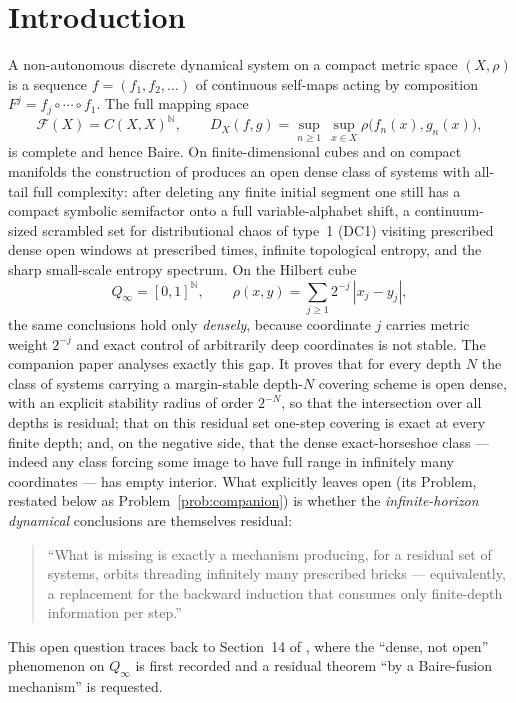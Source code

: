 \documentclass[11pt]{article}
\newcommand{\Q}{Q_\infty}
\newcommand{\F}{\mathcal{F}}
\begin{document}
\section{Introduction}\label{sec:intro}

A non-autonomous discrete dynamical system on a compact metric space $(X,\rho)$ is a
sequence $f=(f_1,f_2,\dots)$ of continuous self-maps acting by composition
$F^j=f_{j}\circ\cdots\circ f_1$.  The full mapping space
\[
\F(X)=C(X,X)^{\mathbb N},
\qquad
D_X(f,g)=\sup_{n\ge1}\,\sup_{x\in X}\rho\bigl(f_n(x),g_n(x)\bigr),
\]
is complete and hence Baire.  On finite-dimensional cubes and on compact manifolds the
construction of \cite{Shmalo2026} produces an open dense class of systems with all-tail
full complexity: after deleting any finite initial segment one still has a compact
symbolic semifactor onto a full variable-alphabet shift, a continuum-sized scrambled
set for distributional chaos of type~1 (DC1) visiting prescribed dense open windows at
prescribed times, infinite topological entropy, and the sharp small-scale entropy
spectrum.  On the Hilbert cube
\[
\Q=[0,1]^{\mathbb N},
\qquad
\rho(x,y)=\sum_{j\ge1}2^{-j}\,|x_j-y_j|,
\]
the same conclusions hold only \emph{densely}, because coordinate $j$ carries metric
weight $2^{-j}$ and exact control of arbitrarily deep coordinates is not stable.  The
companion paper \cite{companion} analyses exactly this gap.  It proves that for every
depth $N$ the class of systems carrying a margin-stable depth-$N$ covering scheme is
open dense, with an explicit stability radius of order $2^{-N}$, so that the
intersection over all depths is residual; that on this residual set one-step covering
is exact at every finite depth; and, on the negative side, that the dense
exact-horseshoe class --- indeed any class forcing some image to have full range in
infinitely many coordinates --- has empty interior.  What \cite{companion} explicitly
leaves open (its Problem, restated below as Problem~\ref{prob:companion}) is whether the
\emph{infinite-horizon dynamical} conclusions are themselves residual:

\begin{quotation}
\noindent``What is missing is exactly a mechanism producing, for a residual set of
systems, orbits threading infinitely many prescribed bricks --- equivalently, a
replacement for the backward induction \cite[Lemma~13.1]{Shmalo2026} that consumes only
finite-depth information per step.''
\end{quotation}

This open question traces back to Section~14 of \cite{Shmalo2026}, where the
``dense, not open'' phenomenon on $\Q$ is first recorded and a residual theorem ``by a
Baire-fusion mechanism'' is requested.
\end{document}
